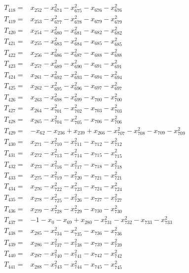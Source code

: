 \begin{align*}
T_{418}={}&x_{252}-x_{674}^{2}-x_{675}^{2}-x_{676}-x_{676}^{2}\\[3pt]
T_{419}={}&x_{253}-x_{677}^{2}-x_{678}^{2}-x_{679}-x_{679}^{2}\\[3pt]
T_{420}={}&x_{254}-x_{680}^{2}-x_{681}^{2}-x_{682}-x_{682}^{2}\\[3pt]
T_{421}={}&x_{255}-x_{683}^{2}-x_{684}^{2}-x_{685}-x_{685}^{2}\\[3pt]
T_{422}={}&x_{256}-x_{686}^{2}-x_{687}^{2}-x_{688}-x_{688}^{2}\\[3pt]
T_{423}={}&x_{257}-x_{689}^{2}-x_{690}^{2}-x_{691}-x_{691}^{2}\\[3pt]
T_{424}={}&x_{261}-x_{692}^{2}-x_{693}^{2}-x_{694}-x_{694}^{2}\\[3pt]
T_{425}={}&x_{262}-x_{695}^{2}-x_{696}^{2}-x_{697}-x_{697}^{2}\\[3pt]
T_{426}={}&x_{263}-x_{698}^{2}-x_{699}^{2}-x_{700}-x_{700}^{2}\\[3pt]
T_{427}={}&x_{264}-x_{701}^{2}-x_{702}^{2}-x_{703}-x_{703}^{2}\\[3pt]
T_{428}={}&x_{265}-x_{704}^{2}-x_{705}^{2}-x_{706}-x_{706}^{2}\\[3pt]
T_{429}={}&-x_{62}-x_{236}+x_{239}+x_{266}-x_{707}^{2}-x_{708}^{2}-x_{709}-x_{709}^{2}\\[3pt]
T_{430}={}&x_{271}-x_{710}^{2}-x_{711}^{2}-x_{712}-x_{712}^{2}\\[3pt]
T_{431}={}&x_{272}-x_{713}^{2}-x_{714}^{2}-x_{715}-x_{715}^{2}\\[3pt]
T_{432}={}&x_{273}-x_{716}^{2}-x_{717}^{2}-x_{718}-x_{718}^{2}\\[3pt]
T_{433}={}&x_{275}-x_{719}^{2}-x_{720}^{2}-x_{721}-x_{721}^{2}\\[3pt]
T_{434}={}&x_{276}-x_{722}^{2}-x_{723}^{2}-x_{724}-x_{724}^{2}\\[3pt]
T_{435}={}&x_{278}-x_{725}^{2}-x_{726}^{2}-x_{727}-x_{727}^{2}\\[3pt]
T_{436}={}&x_{279}-x_{728}^{2}-x_{729}^{2}-x_{730}-x_{730}^{2}\\[3pt]
T_{437}={}&-1-x_{0}-x_{69}+x_{280}-x_{731}^{2}-x_{732}^{2}-x_{733}-x_{733}^{2}\\[3pt]
T_{438}={}&x_{285}-x_{734}^{2}-x_{735}^{2}-x_{736}-x_{736}^{2}\\[3pt]
T_{439}={}&x_{286}-x_{737}^{2}-x_{738}^{2}-x_{739}-x_{739}^{2}\\[3pt]
T_{440}={}&x_{287}-x_{740}^{2}-x_{741}^{2}-x_{742}-x_{742}^{2}\\[3pt]
T_{441}={}&x_{288}-x_{743}^{2}-x_{744}^{2}-x_{745}-x_{745}^{2}\\[3pt]

\end{align*}
